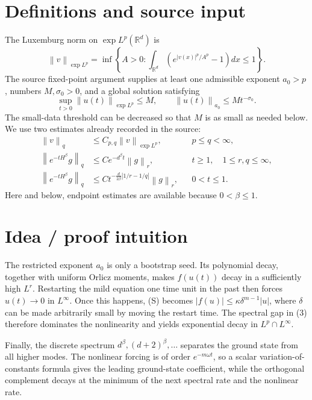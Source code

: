 \documentclass[11pt]{article}
\newcommand{\R}{\mathbb R}
\newcommand{\cE}{\exp L^p}
\newcommand{\norm}[1]{\left\lVert #1\right\rVert}
\begin{document}
\section*{Definitions and source input}
The Luxemburg norm on \(\cE(\R^d)\) is
\[
 \norm{v}_{\cE}
 =\inf\left\{A>0:
 \int_{\R^d}\left(e^{|v(x)|^p/A^p}-1\right)dx\leq1\right\}.
\]
The source fixed-point argument supplies at least one admissible exponent
\(a_0>p\), numbers \(M,\sigma_0>0\), and a global solution satisfying
\begin{equation}
 \sup_{t>0}\norm{u(t)}_{\cE}\leq M,
 \qquad \norm{u(t)}_{a_0}\leq M t^{-\sigma_0}.          \tag{1}
\end{equation}
The small-data threshold can be decreased so that \(M\) is as small as
needed below.  We use two estimates already recorded in the source:
\begin{align}
 \norm{v}_q&\leq C_{p,q}\norm{v}_{\cE},
       &&p\leq q<\infty,                                \tag{2}\\
 \norm{e^{-tH^\beta}g}_q
 &\leq C e^{-d^\beta t}\norm{g}_r,
       &&t\geq1,\quad 1\leq r,q\leq\infty,             \tag{3}\\
 \norm{e^{-tH^\beta}g}_q
 &\leq C t^{-\frac d{2\beta}|1/r-1/q|}\norm{g}_r,
       &&0<t\leq1.                                      \tag{4}
\end{align}
Here and below, endpoint estimates are available because \(0<\beta\leq1\).

\section*{Idea / proof intuition}
The restricted exponent \(a_0\) is only a bootstrap seed.  Its polynomial
decay, together with uniform Orlicz moments, makes \(f(u(t))\) decay in a
sufficiently high \(L^r\).  Restarting the mild equation one time unit in
the past then forces \(u(t)\to0\) in \(L^\infty\).  Once this happens,
(S) becomes
\(|f(u)|\leq\kappa\delta^{m-1}|u|\), where \(\delta\) can be made
arbitrarily small by moving the restart time.  The spectral gap in (3)
therefore dominates the nonlinearity and yields exponential decay in
\(L^p\cap L^\infty\).

Finally, the discrete spectrum
\(d^\beta,(d+2)^\beta,\ldots\) separates the ground state from all higher
modes.  The nonlinear forcing is of order \(e^{-m\omega t}\), so a scalar
variation-of-constants formula gives the leading ground-state coefficient,
while the orthogonal complement decays at the minimum of the next spectral
rate and the nonlinear rate.
\end{document}
